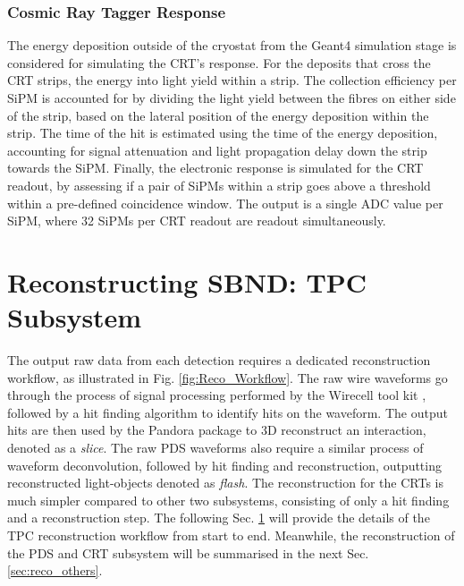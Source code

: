 \subsubsection{Cosmic Ray Tagger Response}

The energy deposition outside of the cryostat from the Geant4 simulation stage is considered for simulating the CRT's response.
For the deposits that cross the CRT strips, the energy into light yield within a strip.
The collection efficiency per SiPM is accounted for by dividing the light yield between the fibres on either side of the strip, based on the lateral position of the energy deposition within the strip. 
The time of the hit is estimated using the time of the energy deposition, accounting for signal attenuation and light propagation delay down the strip towards the SiPM.
Finally, the electronic response is simulated for the CRT readout, by assessing if a pair of SiPMs within a strip goes above a threshold within a pre-defined coincidence window.
The output is a single ADC value per SiPM, where 32 SiPMs per CRT readout are readout simultaneously. 


\section{Reconstructing SBND: TPC Subsystem}
\label{sec:reco_tpc}
The output raw data from each detection requires a dedicated reconstruction workflow, as illustrated in Fig. \ref{fig:Reco_Workflow}.
The raw wire waveforms go through the process of signal processing performed by the Wirecell tool kit \cite{wirecell}, followed by a hit finding algorithm to identify hits on the waveform.
The output hits are then used by the Pandora package \cite{pandora} to 3D reconstruct an interaction, denoted as a \textit{slice}.
The raw PDS waveforms also require a similar process of waveform deconvolution, followed by hit finding and reconstruction, outputting reconstructed light-objects denoted as \textit{flash}.
The reconstruction for the CRTs is much simpler compared to other two subsystems, consisting of only a hit finding and a reconstruction step. 
The following Sec. \ref{sec:reco_tpc} will provide the details of the TPC reconstruction workflow from start to end.
Meanwhile, the reconstruction of the PDS and CRT subsystem will be summarised in the next Sec. \ref{sec:reco_others}.


